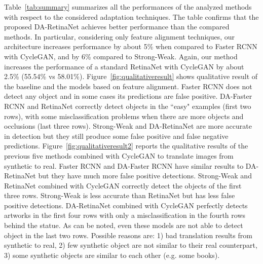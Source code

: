 \documentclass[preprint]{elsarticle}
\begin{document}
Table~\ref{tab:summary} summarizes all the performances of the analyzed methods with respect to the considered adaptation techniques. The table confirms that the proposed DA-RetinaNet achieves better performance than the compared methods. In particular, considering only feature alignment techniques, our architecture increases performance by about 5\% when compared to Faster RCNN with CycleGAN, and by 6\% compared to Strong-Weak. Again, our method increases the performance of a standard RetinaNet with CycleGAN by about 2.5\% (55.54\% vs 58.01\%). Figure~\ref{fig:qualitativeresult} shows qualitative result of the baseline and the models based on feature alignment. Faster RCNN does not detect any object and in some cases its predictions are false positive. DA-Faster RCNN and RetinaNet correctly detect objects in the ``easy" examples (first two rows), with some misclassification problems when there are more objects and occlusions (last three rows). Strong-Weak and DA-RetinaNet are more accurate in detection but they still produce some false positive and false negative predictions. Figure~\ref{fig:qualitativeresult2} reports the qualitative results of the previous five methods combined with CycleGAN to translate images from synthetic to real. Faster RCNN and DA-Faster RCNN have similar results to DA-RetinaNet but they have much more false positive detections. Strong-Weak and RetinaNet combined with CycleGAN correctly detect the objects of the first three rows. Strong-Weak is less accurate than RetinaNet but has less false positive detections. DA-RetinaNet combined with CycleGAN perfectly detects artworks in the first four rows with only a misclassification in the fourth rows behind the statue. As can be noted, even these models are not able to detect object in the last two rows. Possible reasons are: 1) bad translation results from synthetic to real, 2) few synthetic object are not similar to their real counterpart, 3) some synthetic objects are similar to each other (e.g. some books). 
\end{document}
